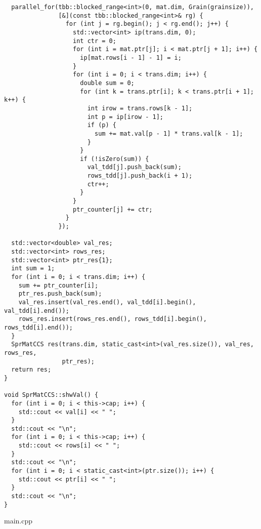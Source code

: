 \documentclass{report}
\begin{document}
\begin{lstlisting}
  parallel_for(tbb::blocked_range<int>(0, mat.dim, Grain(grainsize)),
               [&](const tbb::blocked_range<int>& rg) {
                 for (int j = rg.begin(); j < rg.end(); j++) {
                   std::vector<int> ip(trans.dim, 0);
                   int ctr = 0;
                   for (int i = mat.ptr[j]; i < mat.ptr[j + 1]; i++) {
                     ip[mat.rows[i - 1] - 1] = i;
                   }
                   for (int i = 0; i < trans.dim; i++) {
                     double sum = 0;
                     for (int k = trans.ptr[i]; k < trans.ptr[i + 1]; k++) {
                       int irow = trans.rows[k - 1];
                       int p = ip[irow - 1];
                       if (p) {
                         sum += mat.val[p - 1] * trans.val[k - 1];
                       }
                     }
                     if (!isZero(sum)) {
                       val_tdd[j].push_back(sum);
                       rows_tdd[j].push_back(i + 1);
                       ctr++;
                     }
                   }
                   ptr_counter[j] += ctr;
                 }
               });

  std::vector<double> val_res;
  std::vector<int> rows_res;
  std::vector<int> ptr_res{1};
  int sum = 1;
  for (int i = 0; i < trans.dim; i++) {
    sum += ptr_counter[i];
    ptr_res.push_back(sum);
    val_res.insert(val_res.end(), val_tdd[i].begin(), val_tdd[i].end());
    rows_res.insert(rows_res.end(), rows_tdd[i].begin(), rows_tdd[i].end());
  }
  SprMatCCS res(trans.dim, static_cast<int>(val_res.size()), val_res, rows_res,
                ptr_res);
  return res;
}

void SprMatCCS::shwVal() {
  for (int i = 0; i < this->cap; i++) {
    std::cout << val[i] << " ";
  }
  std::cout << "\n";
  for (int i = 0; i < this->cap; i++) {
    std::cout << rows[i] << " ";
  }
  std::cout << "\n";
  for (int i = 0; i < static_cast<int>(ptr.size()); i++) {
    std::cout << ptr[i] << " ";
  }
  std::cout << "\n";
}

\end{lstlisting}

\newpage
\newline main.cpp
\end{document}
